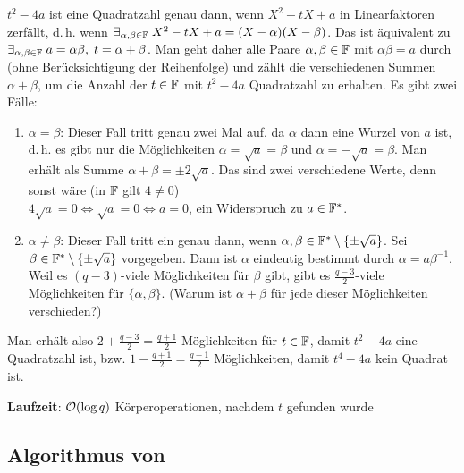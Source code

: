 \begin{Beweis}
    $t^2 - 4a$ ist eine Quadratzahl genau dann, wenn $X^2 - tX + a$ in Linearfaktoren zerfällt,
    d.\,h. wenn $\exists_{\alpha, \beta \in \mathbb{F}}\; X^2 - tX + a = (X - \alpha)(X - \beta)$.
    Das ist äquivalent zu
    $\exists_{\alpha, \beta \in \mathbb{F}}\; a = \alpha\beta,\; t = \alpha + \beta$.
    Man geht daher alle Paare $\alpha, \beta \in \mathbb{F}$ mit $\alpha\beta = a$ durch
    (ohne Berücksichtigung der Reihenfolge)
    und zählt die verschiedenen Summen $\alpha + \beta$,
    um die Anzahl der $t \in \mathbb{F}$ mit $t^2 - 4a$ Quadratzahl zu erhalten.
    Es gibt zwei Fälle:
    \begin{enumerate}
        \item
        $\alpha = \beta$:
        Dieser Fall tritt genau zwei Mal auf, da $\alpha$ dann eine Wurzel von $a$ ist,
        d.\,h. es gibt nur die Möglichkeiten $\alpha = \sqrt{a} = \beta$ und
        $\alpha = -\sqrt{a} = \beta$.
        Man erhält als Summe $\alpha + \beta = \pm 2\sqrt{a}$.
        Das sind zwei verschiedene Werte, denn sonst wäre (in $\mathbb{F}$ gilt $4 \not= 0$)\\
        $4\sqrt{a} = 0 \iff \sqrt{a} = 0 \iff a = 0$, ein Widerspruch zu $a \in \mathbb{F}^\ast$.

        \item
        $\alpha \not= \beta$:
        Dieser Fall tritt ein genau dann, wenn
        $\alpha, \beta \in \mathbb{F}^\ast \setminus \{\pm\sqrt{a}\}$.
        Sei $\beta \in \mathbb{F}^\ast \setminus \{\pm\sqrt{a}\}$ vorgegeben.
        Dann ist $\alpha$ eindeutig bestimmt durch $\alpha = a\beta^{-1}$.
        Weil es $(q - 3)$-viele Möglichkeiten für $\beta$ gibt,
        gibt es $\frac{q-3}{2}$-viele Möglichkeiten für $\{\alpha, \beta\}$.
        (Warum ist $\alpha + \beta$ für jede dieser Möglichkeiten verschieden?)
    \end{enumerate}
    Man erhält also $2 + \frac{q-3}{2} = \frac{q+1}{2}$ Möglichkeiten für $t \in \mathbb{F}$,
    damit $t^2 - 4a$ eine Quadratzahl ist,
    bzw. $1 - \frac{q+1}{2} = \frac{q-1}{2}$ Möglichkeiten, damit $t^4 - 4a$ kein Quadrat ist.
\end{Beweis}

\linie

\textbf{Laufzeit}:
$\mathcal{O}(\log q)$ Körperoperationen, nachdem $t$ gefunden wurde

\pagebreak

\subsection{%
    Algorithmus von %
}

